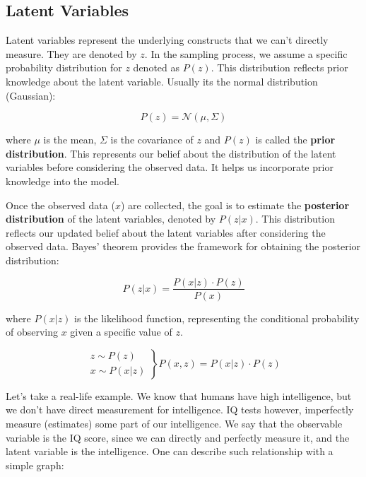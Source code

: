 \subsection{Latent Variables}
\label{appendix:latent_variables}
Latent variables represent the underlying constructs that we can't directly measure. They are denoted by $z$. In the sampling process, we assume a specific probability distribution for $z$ denoted as $P(z)$. This distribution reflects prior knowledge about the latent variable. Usually its the normal distribution (Gaussian):

\[ P(z) = \mathcal{N} (\mu, \Sigma) \]

where $\mu$ is the mean, $\Sigma$ is the covariance of $z$ and $P(z)$ is called the \textbf{prior distribution}. This represents our belief about the distribution of the latent variables before considering the observed data. It helps us incorporate prior knowledge into the model.

Once the observed data ($x$) are collected, the goal is to estimate the \textbf{posterior distribution} of the latent variables, denoted by $P(z|x)$.  This distribution reflects our updated belief about the latent variables after considering the observed data.  Bayes' theorem provides the framework for obtaining the posterior distribution:

\[ P(z|x) = \frac{P(x|z) \cdot P(z)}{P(x)} \]

where $P(x|z)$ is the likelihood function, representing the conditional probability of observing $x$ given a specific value of $z$.


\begin{equation*}
  \left.\begin{aligned}
  z \sim P(z)\\
  x \sim P(x|z)
\end{aligned}\right\} P(x,z) = P(x|z) \cdot P(z)
\end{equation*}


Let's take a real-life example. We know that humans have high intelligence, but we don't have direct measurement for intelligence. IQ tests however, imperfectly measure (estimates) some part of our intelligence. We say that the observable variable is the IQ score, since we can directly and perfectly measure it, and the latent variable is the intelligence. One can describe such relationship with a simple graph:


